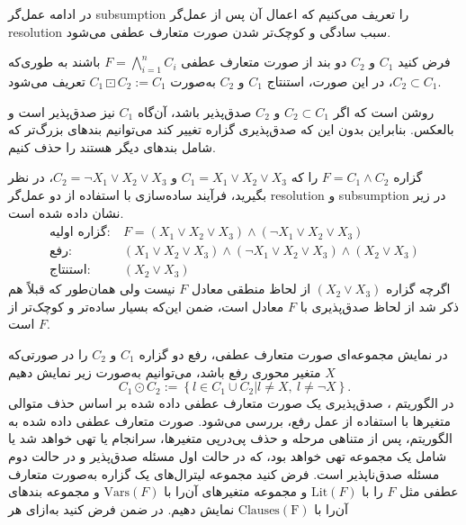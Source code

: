 در ادامه عمل‌گر 
\gls*{subsumption}
را تعریف می‌کنیم که اعمال آن پس از عمل‌‌گر 
\gls*{resolution}
سبب ساد‌گی و کوچک‌تر شدن صورت متعارف عطفی می‌شود. 
\begin{definition}
فرض کنید 
$C_{1}$
و 
$C_{2}$
دو بند از صورت متعارف عطفی 
$F = \bigwedge_{i = 1}^{n} C_{i}$
باشند به طوری‌که 
$C_{2}\subset C_{1}$، 
در این صورت، استنتاج 
$C_{1}$
و 
$C_{2}$
به‌صورت 
$C_{1}\boxdot C_{2}:= C_{1}$
تعریف می‌شود. 
\end{definition}
روشن است که اگر 
$C_{2}\subset C_{1}$
و 
$C_{2}$
صدق‌پذیر باشد، آن‌گاه 
$C_{1}$
نیز صدق‌پذیر است و بالعکس. بنابراین بدون این که صدق‌پذیری گزاره تغییر کند می‌توانیم بندهای بزرگ‌تر که شامل بندهای دیگر هستند را حذف کنیم. 
\begin{example}
گزاره 
$F = C_{1}\wedge C_{2}$
را که 
$C_{1} = X_{1}\vee X_{2}\vee X_{3}$
و 
$C_{2} = \neg X_{1}\vee X_{2}\vee X_{3}$، 
در نظر بگیرید، فرآیند ساده‌سازی با استفاده از دو عمل‌گر 
\gls*{resolution}
و 
\gls*{subsumption}
در زیر نشان داده شده است. 
\begin{align*}
\text{گزاره اولیه}: \ & 
F =  (X_{1}\vee X_{2}\vee X_{3}) \wedge (\neg X_{1}\vee X_{2}\vee X_{3})\\
\text{رفع}: \ & 
(X_{1}\vee X_{2}\vee X_{3})\wedge (\neg X_{1}\vee X_{2}\vee X_{3})\wedge (X_{2}\vee X_{3})\\
\text{استنتاج}: & (X_{2}\vee X_{3})
\end{align*}
اگر‌چه گزاره 
$(X_{2}\vee X_{3})$
از لحاظ منطقی معادل 
$F$
نیست ولی همان‌طور که قبلاً هم ذکر شد از لحاظ صدق‌پذیری با 
$F$
معادل است، ضمن این‌که بسیار ساده‌تر و کوچک‌تر از 
$F$
است.  
\end{example}
در نمایش مجموعه‌ای صورت متعارف عطفی، رفع دو گزاره 
$C_{1}$
و 
$C_{2}$
را در صورتی‌که 
$X$
متغیر محوری رفع باشد، می‌توانیم به‌صورت زیر نمایش دهیم 
\begin{equation*}
C_{1}\odot C_{2}:=\left\{l\in C_{1}\cup C_{2}| l \neq X,  \ l\neq \neg X \right\}.
\end{equation*}
در الگوریتم 
، 
صدق‌پذیری یک صورت متعارف عطفی داده شده  بر اساس حذف متوالی متغیرها با استفاده از عمل رفع، بررسی می‌شود.  صورت متعارف عطفی داده شده به الگوریتم، پس از متناهی مرحله و حذف پی‌درپی متغیرها، سرانجام یا تهی خواهد شد یا شامل یک مجموعه تهی خواهد بود، که در حالت اول مسئله صدق‌پذیر و در حالت دوم مسئله صدق‌ناپذیر است. فرض کنید  مجموعه لیترال‌های یک گزاره به‌صورت متعارف عطفی مثل 
$F$
را با 
$\mathrm{Lit}(F)$
و مجموعه  متغیرهای آن‌را با 
$\mathrm{Vars}(F)$
و مجموعه بندهای  آن‌را با 
$\mathrm{Clauses(F)}$
نمایش دهیم. در ضمن فرض کنید به‌ازای هر 
